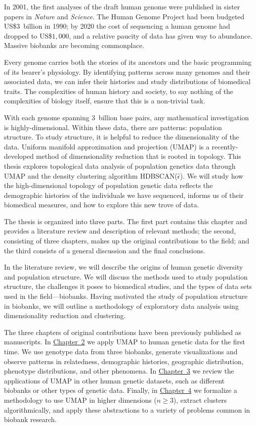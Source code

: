 In 2001, the first analyses of the draft human genome were published in sister papers in \textit{Nature} and \textit{Science}. The Human Genome Project had been budgeted US\$$3$~billion in 1990; by 2020 the cost of sequencing a human genome had dropped to US\$$1,000$, and a relative paucity of data has given way to abundance\citep{gibbs_human_2020}. Massive biobanks are becoming commonplace.

Every genome carries both the stories of its ancestors and the basic programming of its bearer's physiology. By identifying patterns across many genomes and their associated data, we can infer their histories and study distributions of biomedical traits. The complexities of human history and society, to say nothing of the complexities of biology itself, ensure that this is a non-trivial task.

With each genome spanning $3$~billion base pairs, any mathematical investigation is highly-dimensional. Within these data, there are patterns: population structure. To study structure, it is helpful to reduce the dimensionality of the data. Uniform manifold approximation and projection (UMAP) is a recently-developed method of dimensionality reduction that is rooted in topology. This thesis explores topological data analysis of population genetics data through UMAP and the density clustering algorithm HDBSCAN($\hat{\epsilon}$). We will study how the high-dimensional topology of population genetic data reflects the demographic histories of the individuals we have sequenced, informs us of their biomedical measures, and how to explore this new trove of data.

The thesis is organized into three parts. The first part contains this chapter and provides a literature review and description of relevant methods; the second, consisting of three chapters, makes up the original contributions to the field; and the third consists of a general discussion and the final conclusions.

In the literature review, we will describe the origins of human genetic diversity and population structure. We will discuss the methods used to study population structure, the challenges it poses to biomedical studies, and the types of data sets used in the field---biobanks. Having motivated the study of population structure in biobanks, we will outline a methodology of exploratory data analysis using dimensionality reduction and clustering.

The three chapters of original contributions have been previously published as manuscripts. In \hyperref[chap:chapter2]{Chapter~2} we apply UMAP to human genetic data for the first time. We use genotype data from three biobanks, generate visualizations and observe patterns in relatedness, demographic histories, geographic distribution, phenotype distributions, and other phenomena. In \hyperref[chap:chapter3]{Chapter~3} we review the applications of UMAP in other human genetic datasets, such as different biobanks or other types of genetic data. Finally, in \hyperref[chap:chapter4]{Chapter~4} we formalize a methodology to use UMAP in higher dimensions ($n \ge 3$), extract clusters algorithmically, and apply these abstractions to a variety of problems common in biobank research.

